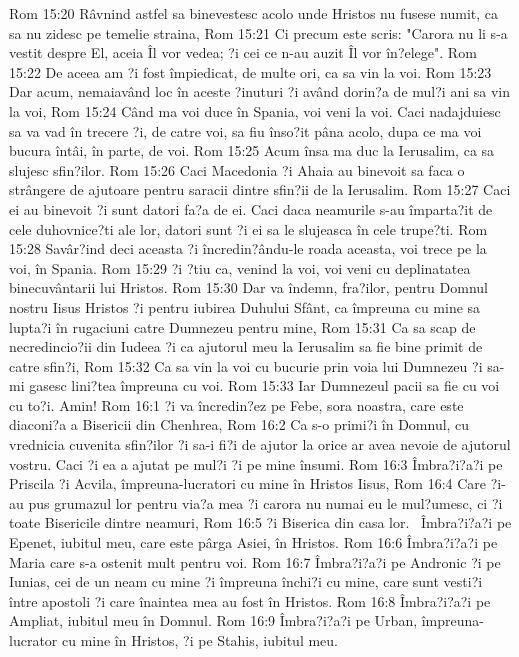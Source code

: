 Rom 15:20  Râvnind astfel sa binevestesc acolo unde Hristos nu fusese numit, ca sa nu zidesc pe temelie straina,
Rom 15:21  Ci precum este scris: "Carora nu li s-a vestit despre El, aceia Îl vor vedea; ?i cei ce n-au auzit Îl vor în?elege".
Rom 15:22  De aceea am ?i fost împiedicat, de multe ori, ca sa vin la voi.
Rom 15:23  Dar acum, nemaiavând loc în aceste ?inuturi ?i având dorin?a de mul?i ani sa vin la voi,
Rom 15:24  Când ma voi duce în Spania, voi veni la voi. Caci nadajduiesc sa va vad în trecere ?i, de catre voi, sa fiu înso?it pâna acolo, dupa ce ma voi bucura întâi, în parte, de voi.
Rom 15:25  Acum însa ma duc la Ierusalim, ca sa slujesc sfin?ilor.
Rom 15:26  Caci Macedonia ?i Ahaia au binevoit sa faca o strângere de ajutoare pentru saracii dintre sfin?ii de la Ierusalim.
Rom 15:27  Caci ei au binevoit ?i sunt datori fa?a de ei. Caci daca neamurile s-au împarta?it de cele duhovnice?ti ale lor, datori sunt ?i ei sa le slujeasca în cele trupe?ti.
Rom 15:28  Savâr?ind deci aceasta ?i încredin?ându-le roada aceasta, voi trece pe la voi, în Spania.
Rom 15:29  ?i ?tiu ca, venind la voi, voi veni cu deplinatatea binecuvântarii lui Hristos.
Rom 15:30  Dar va îndemn, fra?ilor, pentru Domnul nostru Iisus Hristos ?i pentru iubirea Duhului Sfânt, ca împreuna cu mine sa lupta?i în rugaciuni catre Dumnezeu pentru mine,
Rom 15:31  Ca sa scap de necredincio?ii din Iudeea ?i ca ajutorul meu la Ierusalim sa fie bine primit de catre sfin?i,
Rom 15:32  Ca sa vin la voi cu bucurie prin voia lui Dumnezeu ?i sa-mi gasesc lini?tea împreuna cu voi.
Rom 15:33  Iar Dumnezeul pacii sa fie cu voi cu to?i. Amin!
Rom 16:1  ?i va încredin?ez pe Febe, sora noastra, care este diaconi?a a Bisericii din Chenhrea,
Rom 16:2  Ca s-o primi?i în Domnul, cu vrednicia cuvenita sfin?ilor ?i sa-i fi?i de ajutor la orice ar avea nevoie de ajutorul vostru. Caci ?i ea a ajutat pe mul?i ?i pe mine însumi.
Rom 16:3  Îmbra?i?a?i pe Priscila ?i Acvila, împreuna-lucratori cu mine în Hristos Iisus,
Rom 16:4  Care ?i-au pus grumazul lor pentru via?a mea ?i carora nu numai eu le mul?umesc, ci ?i toate Bisericile dintre neamuri,
Rom 16:5  ?i Biserica din casa lor.  Îmbra?i?a?i pe Epenet, iubitul meu, care este pârga Asiei, în Hristos.
Rom 16:6  Îmbra?i?a?i pe Maria care s-a ostenit mult pentru voi.
Rom 16:7  Îmbra?i?a?i pe Andronic ?i pe Iunias, cei de un neam cu mine ?i împreuna închi?i cu mine, care sunt vesti?i între apostoli ?i care înaintea mea au fost în Hristos.
Rom 16:8  Îmbra?i?a?i pe Ampliat, iubitul meu în Domnul.
Rom 16:9  Îmbra?i?a?i pe Urban, împreuna-lucrator cu mine în Hristos, ?i pe Stahis, iubitul meu.
